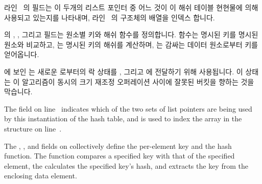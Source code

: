 \begin{fcvref}
\begin{fcvref}

라인~ 의  필드는 이 두개의 리스트 포인터 중 어느
것이 이 해쉬 테이블 현현물에 의해 사용되고 있는지를 나타내며,
라인~ 의  구조체의  배열을
인덱스 합니다.

 의
, , 그리고  필드는 원소별
키와 해쉬 함수를 정의합니다.
 함수는 명시된 키를 명시된 원소와 비교하고, 
는 명시된 키의 해쉬를 계산하며,  는 감싸는 데이터 원소로부터
키를 얻어옵니다.

 에 보인
 는 새로운  로부터의 락 상태를
,  그리고  에
전달하기 위해 사용됩니다.
이 상태는 이 알고리즘이 동시의 크기 재조정 오퍼레이션 사이에 잘못된 버킷을
향하는 것을 막습니다.

\iffalse

The  field on
line~ indicates which of the two sets of
list pointers are being used by this instantiation of the hash table,
and is used to index the  array in the 
structure on line~.

The , , and  fields on
collectively define the per-element key and the hash function.
The  function compares a specified key with that of
the specified element,
the  calculates the specified key's hash,
and  extracts the key from the enclosing data
element.


\end{fcvref}
\end{fcvref}
